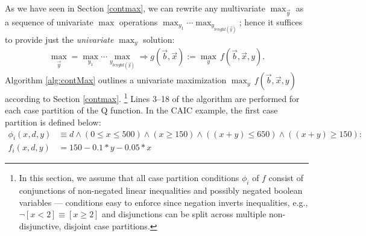 \documentclass[twoside,11pt]{article}
\begin{document}
As we have seen in Section \ref{contmax}, we can
rewrite any multivariate $\max_{\vec{y}}$ as a sequence of univariate
$\max$ operations $\max_{y_1} \cdots \max_{y_{\textit{lenght}(\vec{y})}}$; hence it
suffices to provide just the \emph{univariate} $\max_y$ solution:
\begin{align}
\max_{\vec{y}} =\max_{y_1} \cdots \max_{y_{\textit{lenght}(\vec{y})}} \Rightarrow g(\vec{b},\vec{x}) := \max_{y} \, f(\vec{b},\vec{x},y). \nonumber
\end{align}
Algorithm \ref{alg:contMax} outlines a univariate maximization  
$\max_{y} \, f(\vec{b},\vec{x},y)$ according to Section \ref{contmax}. \footnote{In this section, we assume that all case partition conditions $\phi_i$ of
$f$ consist of conjunctions of non-negated linear inequalities and
possibly negated boolean variables --- conditions easy to enforce
since negation inverts inequalities, e.g., $\neg [x < 2] \equiv [x \geq 2]$
and disjunctions can be split across multiple non-disjunctive, 
disjoint case partitions.} 
Lines 3--18 of the algorithm are performed for each case partition of the Q function. In the CAIC example, the first case partition is defined below: 
\begin{align*}
\phi_i(x,d,y) &\equiv d \land (0 \leq x \leq 500) \land (x \geq 150) \land ((x+y) \leq 650) \land ((x+y) \geq 150): \\
f_i(x,d,y) &= 150 - 0.1 * y - 0.05 * x
\end{align*}
\end{document}
